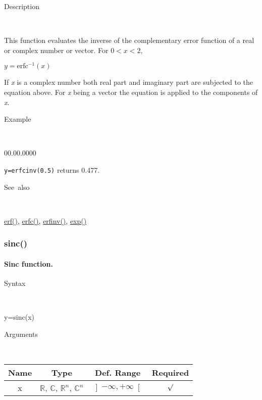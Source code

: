 \begin{description}
\item [Description]~
\end{description}
This function evaluates the inverse of the complementary error function
of a real or complex number or vector. For $0<x<2$,

\medskip{}
$y=\mathit{\mathrm{erfc^{-1}}}(x)$
\medskip{}

If \textit{x} is a complex number both real part and imaginary
part are subjected to the equation above. For \textit{x} being a vector
the equation is applied to the components of \textit{x}.

\begin{description}
\item [Example]~
\end{description}
\begin{lyxlist}{00.00.0000}
\item [\texttt{y=erfcinv(0.5)}]returns 0.477.
\end{lyxlist}
\begin{description}
\item [See~also]~
\end{description}
\textcolor{blue}{\hyperlink{erf}{erf()}}\textcolor{black}{,} \textcolor{blue}{\hyperlink{erfc}{erfc()}}\textcolor{black}{,}
\textcolor{blue}{\hyperlink{erfinv}{erfinv()}}\textcolor{black}{,}
\textcolor{blue}{\hyperlink{exp}{exp()}}


\newpage
\subsubsection*{\hypertarget{sinc}{}{\Large sinc()}}


\paragraph{\label{par:Sinc-function}Sinc function.}

\begin{description}
\item [Syntax]~
\end{description}
y=sinc(x)

\begin{description}
\item [Arguments]~
\end{description}
\begin{tabular}{|c|c|c|c|}
\hline 
Name&
Type&
Def. Range&
Required\tabularnewline
\hline
\hline 
x&
$\mathbb{R}$, $\mathbb{C}$, $\mathbb{R}^{n}$, $\mathbb{C}^{n}$&
$\left]-\infty,+\infty\right[$&
$\surd$\tabularnewline
\hline
\end{tabular}

